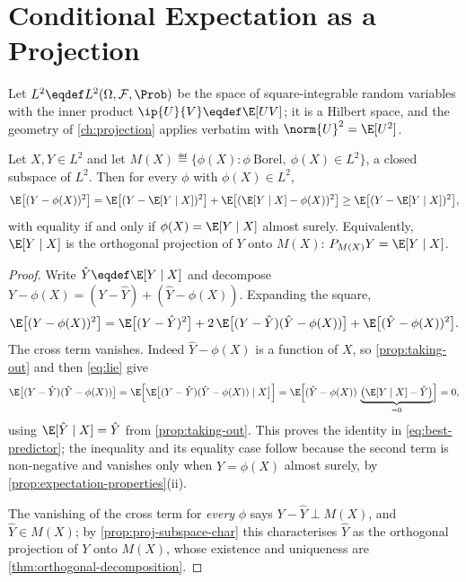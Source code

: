 \section{Conditional Expectation as a Projection}\label{sec:prob-projection}

Let $L^{2}\eqdef L^{2}(\Omega,\mathcal{F},\Prob)$ be the space of square-integrable random
variables with the inner product $\ip{U}{V}\eqdef\E[UV]$; it is a Hilbert space,
and the geometry of \autoref{ch:projection} applies verbatim with
$\norm{U}^{2}=\E[U^{2}]$.

\begin{theorem}\label{thm:best-predictor}
	Let $X,Y\in L^{2}$ and let
	$M(X)\eqdef\{\phi(X) : \phi\ \text{Borel},\ \phi(X)\in L^{2}\}$, a closed
	subspace of $L^{2}$. Then for every $\phi$ with $\phi(X)\in L^{2}$,
	\begin{equation}\label{eq:best-predictor}
		\E\bigl[(Y-\phi(X))^{2}\bigr]
		=\E\bigl[(Y-\E[Y\mid X])^{2}\bigr]
		+\E\bigl[(\E[Y\mid X]-\phi(X))^{2}\bigr]
		\geq\E\bigl[(Y-\E[Y\mid X])^{2}\bigr],
	\end{equation}
	with equality if and only if $\phi(X)=\E[Y\mid X]$ almost surely. Equivalently,
	$\E[Y\mid X]$ is the orthogonal projection of $Y$ onto $M(X)$:
	$P_{M(X)}Y=\E[Y\mid X]$.
\end{theorem}

\begin{proof}
	Write $\hat Y\eqdef\E[Y\mid X]$ and decompose
	$Y-\phi(X)=(Y-\hat Y)+(\hat Y-\phi(X))$. Expanding the square,
	\[
		\E\bigl[(Y-\phi(X))^{2}\bigr]
		=\E\bigl[(Y-\hat Y)^{2}\bigr]
		+2\,\E\bigl[(Y-\hat Y)(\hat Y-\phi(X))\bigr]
		+\E\bigl[(\hat Y-\phi(X))^{2}\bigr].
	\]
	The cross term vanishes. Indeed $\hat Y-\phi(X)$ is a function of $X$, so
	\autoref{prop:taking-out} and then \eqref{eq:lie} give
	\[
		\E\bigl[(Y-\hat Y)(\hat Y-\phi(X))\bigr]
		=\E\Bigl[\E\bigl[(Y-\hat Y)(\hat Y-\phi(X))\mid X\bigr]\Bigr]
		=\E\Bigl[(\hat Y-\phi(X))\,\underbrace{\bigl(\E[Y\mid X]-\hat Y\bigr)}_{=0}\Bigr]
		=0,
	\]
	using $\E[\hat Y\mid X]=\hat Y$ from \autoref{prop:taking-out}. This proves the
	identity in \eqref{eq:best-predictor}; the inequality and its equality case
	follow because the second term is non-negative and vanishes only when
	$\hat Y=\phi(X)$ almost surely, by
	\autoref{prop:expectation-properties}(ii).

	The vanishing of the cross term for \emph{every} $\phi$ says
	$Y-\hat Y\perp M(X)$, and $\hat Y\in M(X)$; by
	\autoref{prop:proj-subspace-char} this characterises $\hat Y$ as the orthogonal
	projection of $Y$ onto $M(X)$, whose existence and uniqueness are
	\autoref{thm:orthogonal-decomposition}.
\end{proof}

